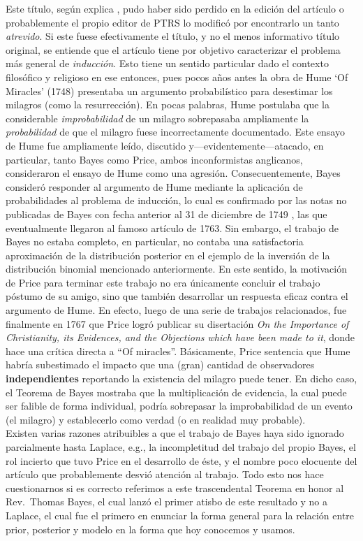Este título, según explica \cite{stigler2013}, pudo haber sido perdido en la edición del artículo o probablemente el propio editor de PTRS lo modificó por encontrarlo un tanto \emph{atrevido}.  Si este fuese efectivamente el título, y no el menos informativo título original, se entiende que el artículo tiene por objetivo caracterizar  el problema más general de \emph{inducción}. Esto tiene un sentido particular dado el contexto filosófico y religioso en ese entonces, pues pocos años antes la obra de Hume `Of Miracles' (1748) presentaba un argumento probabilístico para desestimar los milagros (como la resurrección). En  pocas  palabras, Hume postulaba que la considerable \emph{improbabilidad} de un milagro sobrepasaba ampliamente la \emph{probabilidad}  de  que el milagro fuese incorrectamente  documentado. Este ensayo de Hume fue ampliamente leído, discutido y---evidentemente---atacado, en particular, tanto Bayes como Price, ambos inconformistas anglicanos, consideraron  el ensayo de Hume como una agresión. Consecuentemente, Bayes consideró responder al argumento de  Hume mediante la aplicación de probabilidades al problema de inducción, lo cual es confirmado por las notas no publicadas de Bayes con fecha anterior al 31 de diciembre de 1749 \cite{bellhouse_2004}, las que eventualmente llegaron al famoso artículo de 1763. Sin embargo, el trabajo de Bayes no estaba completo, en particular, no contaba una satisfactoria aproximación de la distribución posterior en el ejemplo de la inversión de la distribución binomial mencionado anteriormente. En este sentido, la motivación de Price para terminar este trabajo no era únicamente concluir el trabajo póstumo de su amigo, sino que también desarrollar un respuesta eficaz contra el argumento de Hume. En efecto, luego de una serie de  trabajos relacionados, fue  finalmente en 1767 que Price logró publicar su disertación \emph{On the Importance of Christianity, its Evidences, and the Objections which have been made to it}, donde hace una crítica directa a “Of miracles”. Básicamente, Price sentencia que Hume habría subestimado el impacto que una (gran) cantidad de observadores \textbf{independientes} reportando la existencia del milagro puede tener. En dicho caso, el Teorema de Bayes mostraba que la multiplicación de evidencia, la cual puede ser falible de forma individual, podría sobrepasar la improbabilidad de un evento (el milagro) y establecerlo como verdad (o en realidad muy probable). \\

Existen varias razones atribuibles a que el trabajo de Bayes haya sido ignorado parcialmente hasta Laplace, e.g., la incompletitud del trabajo del propio Bayes, el rol incierto que tuvo Price en el desarrollo de éste, y el nombre poco elocuente del artículo que probablemente desvió atención al trabajo. Todo esto nos hace cuestionarnos si es correcto referimos a este trascendental Teorema en honor al Rev.~Thomas Bayes, el cual lanzó el primer atisbo de este resultado y no a Laplace, el cual fue el primero en enunciar la forma general para la relación entre prior, posterior y modelo en la forma que hoy conocemos y usamos. 

